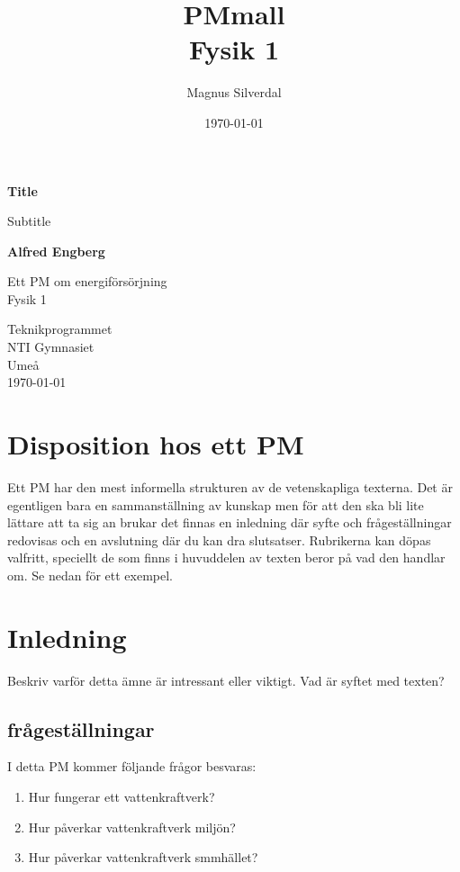 \documentclass[11p]{article}
\title{PMmall \\ \small Fysik 1}
\author{Magnus Silverdal }
\date{\today}
\begin{document}
    \begin{titlepage}
        \begin{center}
            \vspace*{1cm}

            \Huge
            \textbf{Title}

            \vspace{0.5cm}
            \LARGE
            Subtitle

            \vspace{1.5cm}

            \textbf{Alfred Engberg}

            \vfill

            Ett PM om energiförsörjning \\
            Fysik 1

            \vspace{0.8cm}


            \Large
            Teknikprogrammet\\
            NTI Gymnasiet\\
            Umeå\\
            \today

        \end{center}
    \end{titlepage}
    \tableofcontents
    \newpage
    \section{Disposition hos ett PM}
    Ett PM har den mest informella strukturen av de vetenskapliga texterna.
    Det är egentligen bara en sammanställning av kunskap men för att den ska bli lite lättare att ta sig an brukar det finnas en inledning där syfte och frågeställningar redovisas och en avslutning där du kan dra slutsatser.
    Rubrikerna kan döpas valfritt, speciellt de som finns i huvuddelen av texten beror på vad den handlar om.
    Se nedan för ett exempel.

    \section{Inledning}
    Beskriv varför detta ämne är intressant eller viktigt. Vad är syftet med texten?
    \subsection{frågeställningar}
    I detta PM kommer följande frågor besvaras:
    \begin{enumerate}
        \item Hur fungerar ett vattenkraftverk?
        \item Hur påverkar vattenkraftverk miljön?
        \item Hur påverkar vattenkraftverk smmhället?
    \end{enumerate}
\end{document}

